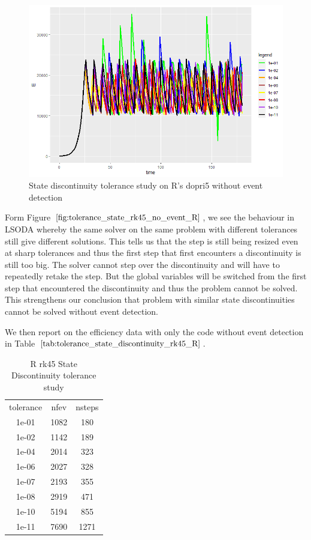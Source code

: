 \begin{figure}[h]
	\centering
	\includegraphics[width=0.7\linewidth]{./figures/tolerance_state_rk45_no_event_R}
	\caption{State discontinuity tolerance study on R's dopri5 without event detection}
	\label{fig:tolerance_state_rk45_no_event_R}
\end{figure}

Form Figure $\ref{fig:tolerance_state_rk45_no_event_R}$, we see the behaviour in LSODA whereby the same solver on the same problem with different tolerances still give different solutions. This tells us that the step is still being resized even at sharp tolerances and thus the first step that first encounters a discontinuity is still too big. The solver cannot step over the discontinuity and will have to repeatedly retake the step. But the global variables will be switched from the first step that encountered the discontinuity and thus the problem cannot be solved. This strengthens our conclusion that problem with similar state discontinuities cannot be solved without event detection.

We then report on the efficiency data with only the code without event detection in Table $\ref{tab:tolerance_state_discontinuity_rk45_R}$. 

\begin{table}[h]
\caption {R rk45 State Discontinuity tolerance study} \label{tab:tolerance_state_discontinuity_rk45_R} 
\begin{center}
\begin{tabular}{ c c c }
tolerance & nfev  & nsteps  \\ 
1e-01 & 1082 &  180 \\
1e-02 & 1142 &  189 \\
1e-04 & 2014 &  323 \\
1e-06 & 2027 &  328 \\
1e-07 & 2193 &  355 \\
1e-08 & 2919 &  471 \\
1e-10 & 5194 &  855 \\
1e-11 & 7690 & 1271 \\
\end{tabular}
\end{center}
\end{table}

